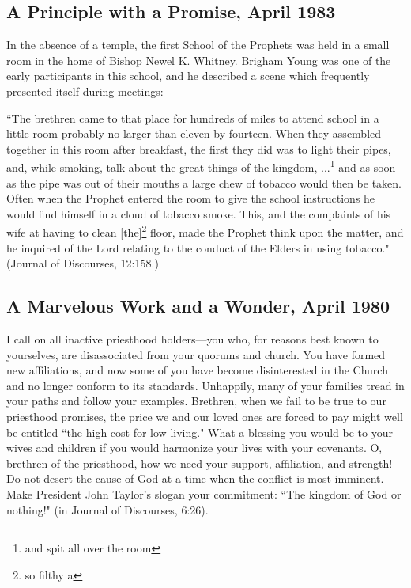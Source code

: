 \subsection{A Principle with a Promise, April 1983}

In the absence of a temple, the first School of the Prophets was held in a small room in the home of Bishop Newel K. Whitney. Brigham Young was one of the early participants in this school, and he described a scene which frequently presented itself during meetings:

``The brethren came to that place for hundreds of miles to attend school in a little room probably no larger than eleven by fourteen. When they assembled together in this room after breakfast, the first they did was to light their pipes, and, while smoking, talk about the great things of the kingdom, ...\footnote{and spit all over the room} and as soon as the pipe was out of their mouths a large chew of tobacco would then be taken. Often when the Prophet entered the room to give the school instructions he would find himself in a cloud of tobacco smoke. This, and the complaints of his wife at having to clean [the]\footnote{so filthy a} floor, made the Prophet think upon the matter, and he inquired of the Lord relating to the conduct of the Elders in using tobacco." (Journal of Discourses, 12:158.)

\subsection{A Marvelous Work and a Wonder, April 1980}

I call on all inactive priesthood holders—you who, for reasons best known to yourselves, are disassociated from your quorums and church. You have formed new affiliations, and now some of you have become disinterested in the Church and no longer conform to its standards. Unhappily, many of your families tread in your paths and follow your examples. Brethren, when we fail to be true to our priesthood promises, the price we and our loved ones are forced to pay might well be entitled ``the high cost for low living." What a blessing you would be to your wives and children if you would harmonize your lives with your covenants. O, brethren of the priesthood, how we need your support, affiliation, and strength! Do not desert the cause of God at a time when the conflict is most imminent. Make President John Taylor’s slogan your commitment: ``The kingdom of God or nothing!" (in Journal of Discourses, 6:26).

